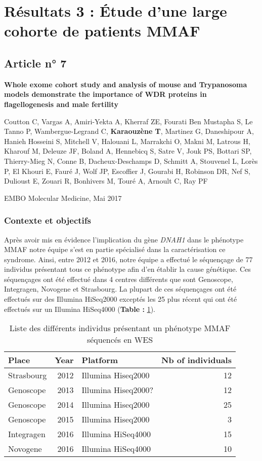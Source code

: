 \documentclass[12pt,twoside]{ugathesis}
\begin{document}
\newpage  

\section{Résultats 3 : Étude d'une large cohorte de patients
MMAF}\label{resultats-3-etude-dune-large-cohorte-de-patients-mmaf}

\subsection{Article n° 7}\label{article-n-7}

\textbf{Whole exome cohort study and analysis of mouse and Trypanosoma
models demonstrate the importance of WDR proteins in flagellogenesis and
male fertility}

Coutton C, Vargas A, Amiri-Yekta A, Kherraf ZE, Fourati Ben Mustapha S,
Le Tanno P, Wambergue-Legrand C, \textbf{Karaouzène T}, Martinez G,
Daneshipour A, Hanieh Hosseini S, Mitchell V, Halouani L, Marrakchi O,
Makni M, Latrous H, Kharouf M, Deleuze JF, Boland A, Hennebicq S, Satre
V, Jouk PS, Bottari SP, Thierry-Mieg N, Conne B, Dacheux-Deschamps D,
Schmitt A, Stouvenel L, Lorès P, El Khouri E, Fauré J, Wolf JP,
Escoffier J, Gourabi H, Robinson DR, Nef S, Dulioust E, Zouari R,
Bonhivers M, Touré A, Arnoult C, Ray PF

EMBO Molecular Medicine, Mai 2017

\newpage

\subsubsection{Contexte et objectifs}\label{contexte-et-objectifs-4}

Après avoir mis en évidence l'implication du gène \emph{DNAH1} dans le
phénotype MMAF notre équipe s'est en partie spécialisé dans la
caractérisation ce syndrome. Ainsi, entre 2012 et 2016, notre équipe a
effectué le séquençage de 77 individus présentant tous ce phénotype afin
d'en établir la cause génétique. Ces séquençages ont été effectué dans 4
centres différents que sont Genoscope, Integragen, Novogene et
Strasbourg. La plupart de ces séquençages ont été effectués sur des
Illumina HiSeq2000 exceptés les 25 plus récent qui ont été effectués sur
un Illumina HiSeq4000 (\textbf{Table : }\ref{tab:tabrunbigmmaf}).

\begin{longtable}[t]{lrlr}
\caption{\label{tab:tabrunbigmmaf}Liste des différents individus présentant un phénotype MMAF séquencés en WES}\\
\toprule
Place & Year & Platform & Nb of individuals\\
\midrule
Strasbourg & 2012 & Illumina Hiseq2000 & 12\\
Genoscope & 2013 & Illumina Hiseq2000? & 12\\
Genoscope & 2014 & Illumina Hiseq2000 & 25\\
Genoscope & 2015 & Illumina Hiseq2000 & 3\\
Integragen & 2016 & Illumina HiSeq4000 & 15\\
Novogene & 2016 & Illumina HiSeq4000 & 10\\
\bottomrule
\end{longtable}
\end{document}
